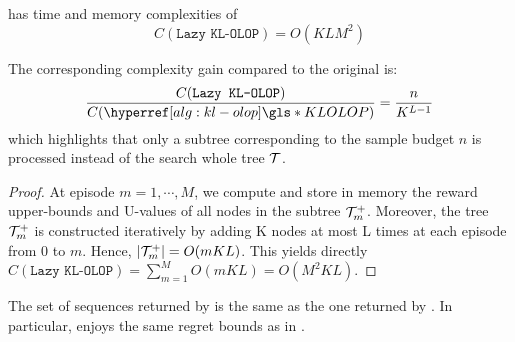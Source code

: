 \begin{proposition}
	\begin{leftbar}[propositionbar]
		 has time and memory complexities of
		\begin{equation*}
		C(\texttt{Lazy KL-OLOP}) = O(KLM^2)
		\end{equation*}
		
		The corresponding complexity gain compared to the original  is: 
		\begin{equation*}
		\frac{C(\texttt{Lazy KL-OLOP})}{C(\KLOLOP)} = \frac{n}{K^{L-1}}
		\end{equation*}
		which highlights that only a subtree corresponding to the sample budget $n$ is processed instead of the search whole tree $\mathcal{T}$.
	\end{leftbar}
\end{proposition}
\begin{proof}
	At episode $m = 1, \cdots, M$, we compute and store in memory the reward upper-bounds and U-values of all nodes in the subtree $\mathcal{T}_m^+$. Moreover, the tree $\mathcal{T}_m^+$ is constructed iteratively by adding K nodes at most L times at each episode from 0 to $m$. Hence, $|\mathcal{T}_m^+| = O(mKL)$.
	This yields directly $C(\texttt{Lazy KL-OLOP}) = \sum_{m=1}^M O(mKL) = O(M^2KL)$.
\end{proof}

\begin{proposition}[Consistency]
	\label{prop:consistency}
	\begin{leftbar}[propositionbar]
		The set of sequences returned by  is the same as the one returned by .
		In particular,  enjoys the same regret bounds as in .
	\end{leftbar}
\end{proposition}

